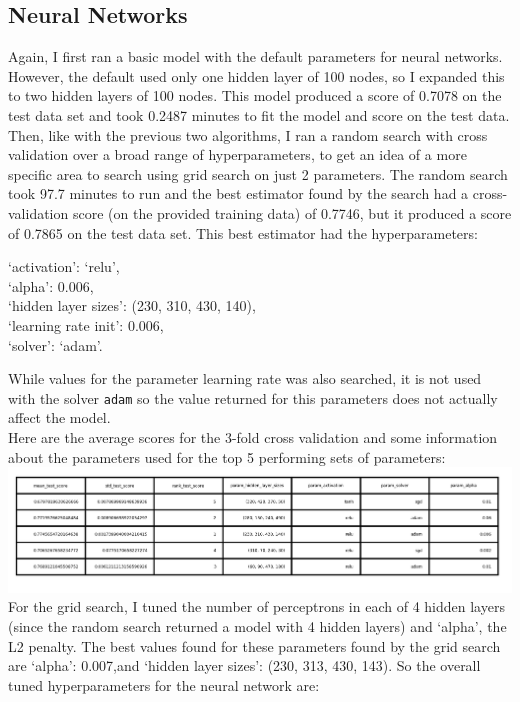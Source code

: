 \documentclass{article}
\begin{document}
\subsection{Neural Networks}
Again, I first ran a basic model with the default parameters for neural networks. However, the default used only one hidden layer of 100 nodes, so I expanded this to two hidden layers of 100 nodes. This model produced a score of 0.7078 on the test data set and took 0.2487 minutes to fit the model and score on the test data.
\bigskip \\Then, like with the previous two algorithms, I ran a random search with cross validation over a broad range of hyperparameters, to get an idea of a more specific area to search using grid search on just 2 parameters. The random search took 97.7 minutes to run and the best estimator found by the search had a cross-validation score (on the provided training data) of 0.7746, but it produced a score of 0.7865 on the test data set. This best estimator had the hyperparameters:
\begin{center}
`activation': `relu',
\\`alpha': 0.006,
\\`hidden layer sizes': (230, 310, 430, 140),
\\`learning rate init': 0.006,
\\`solver': `adam'. 
\end{center}
While values for the parameter learning rate was also searched, it is not used with the solver \texttt{adam} so the value returned for this parameters does not actually affect the model.
\\Here are the average scores for the 3-fold cross validation and some information about the parameters used for the top 5 performing sets of parameters: 
\\\includegraphics[scale=1.3]{NeuralNetRandomSearchTable.png}
For the grid search, I tuned the number of perceptrons in each of 4 hidden layers (since the random search returned a model with 4 hidden layers) and `alpha', the L2 penalty. The best values found for these parameters found by the grid search are `alpha': 0.007,and `hidden layer sizes': (230, 313, 430, 143). So the overall tuned hyperparameters for the neural network are: 
\end{document}
